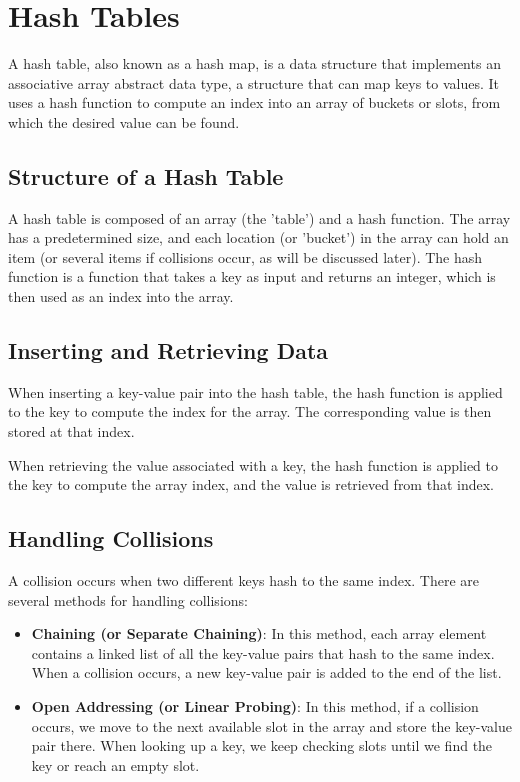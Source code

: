 \chapter{Hash Tables}

A hash table, also known as a hash map, is a data structure that
implements an associative array abstract data type, a structure that
can map keys to values. It uses a hash function to compute an index
into an array of buckets or slots, from which the desired value can be
found.

\section{Structure of a Hash Table}

A hash table is composed of an array (the 'table') and a hash
function. The array has a predetermined size, and each location (or
'bucket') in the array can hold an item (or several items if
collisions occur, as will be discussed later). The hash function is a
function that takes a key as input and returns an integer, which is
then used as an index into the array.

\section{Inserting and Retrieving Data}

When inserting a key-value pair into the hash table, the hash function
is applied to the key to compute the index for the array. The
corresponding value is then stored at that index.

When retrieving the value associated with a key, the hash function is
applied to the key to compute the array index, and the value is
retrieved from that index.

\section{Handling Collisions}

A collision occurs when two different keys hash to the same
index. There are several methods for handling
collisions:

\begin{itemize}
    \item \textbf{Chaining (or Separate Chaining)}: In this method,
      each array element contains a linked list of all the key-value
      pairs that hash to the same index. When a collision occurs, a
      new key-value pair is added to the end of the list.
    \item \textbf{Open Addressing (or Linear Probing)}: In this
      method, if a collision occurs, we move to the next available
      slot in the array and store the key-value pair there. When
      looking up a key, we keep checking slots until we find the key
      or reach an empty slot.
\end{itemize}


